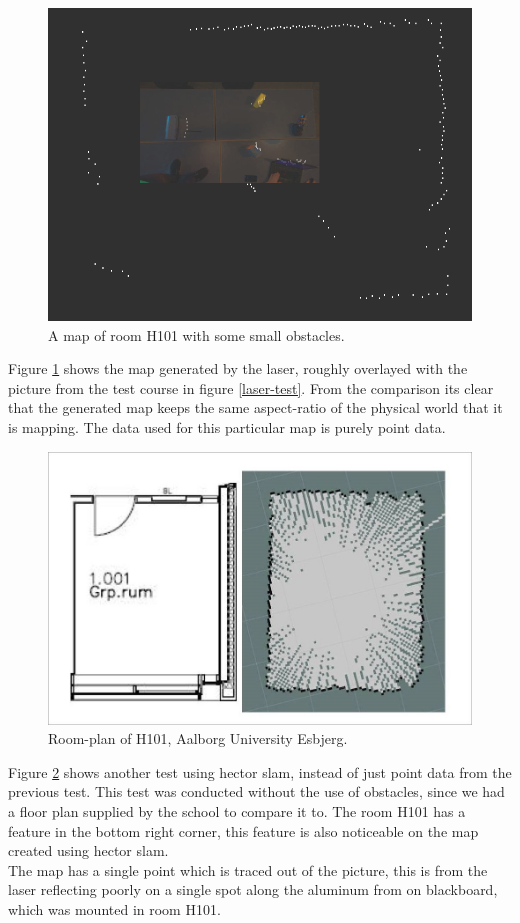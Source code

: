 \begin{figure}[H]
	\centering
	\includegraphics[scale=.4]{images/h101_obstacles_overlay.png}
	\caption{A map of room H101 with some small obstacles.}
	\label{laser-compare}
\end{figure}
	
Figure \ref{laser-compare} shows the map generated by the laser, roughly overlayed with the picture from the test course in figure \ref{laser-test}. From the comparison its clear that the generated map keeps the same aspect-ratio of the physical world that it is mapping. The data used for this particular map is purely point data.


\begin{figure}[H]
	\centering
	\includegraphics[width=.7\linewidth]{images/compare.jpg}
	\caption{Room-plan of H101, Aalborg University Esbjerg.}
	\label{h101hector}
\end{figure}

Figure \ref{h101hector} shows another test using hector slam, instead of just point data from the previous test. This test was conducted without the use of obstacles, since we had a floor plan supplied by the school to compare it to. The room H101 has a feature in the bottom right corner, this feature is also noticeable on the map created using hector slam.\\
The map has a single point which is traced out of the picture, this is from the laser reflecting poorly on a single spot along the aluminum from on blackboard, which was mounted in room H101.

